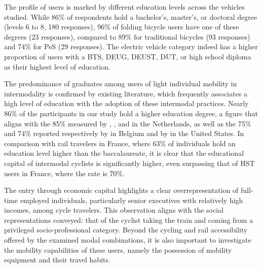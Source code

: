 \begin{refsegment}
The profile of users is marked by different education levels across the vehicles studied. While 86\% of respondents hold a bachelor's, master's, or doctoral degree (levels $6$ to $8$, 180 responses), 96\% of folding bicycle users have one of these degrees (23 responses), compared to 89\% for traditional bicycles (93 responses) and 74\% for \acrshort{PeS} (29 responses). The electric vehicle category indeed has a higher proportion of users with a \acrshort{BTS}, \acrshort{DEUG}, \acrshort{DEUST}, \acrshort{DUT}, or high school diploma as their highest level of education.%


The predominance of graduates among users of light individual mobility in intermodality is confirmed by existing literature, which frequently associates a high level of education with the adoption of these intermodal practices. Nearly 86\% of the participants in our study hold a higher education degree, a figure that aligns with the 85\% measured by \textcolor{blue}{\textcite[15]{shelat_analysing_2018}}, \textcolor{blue}{\textcite[113]{heinen_multimodal_2014}}, and \textcolor{blue}{\textcite[11]{jonkeren_bicycle-train_2021}} in the Netherlands, as well as the 75\% and 74\% reported respectively by \textcolor{blue}{\textcite[6, 8]{adnan_last-mile_2019}} in Belgium and by \textcolor{blue}{\textcite[103]{flamm_public_2014}} in the United States. In comparison with rail travelers in France, where 63\% of individuals hold an education level higher than the baccalaureate, it is clear that the educational capital of intermodal cyclists is significantly higher, even surpassing that of \acrshort{HST} users in France, where the rate is 70\%.%

The entry through economic capital highlights a clear overrepresentation of full-time employed individuals, particularly senior executives with relatively high incomes, among cycle travelers. This observation aligns with the social representations conveyed: that of the cyclist taking the train and coming from a privileged socio-professional category. Beyond the cycling and rail accessibility offered by the examined modal combinations, it is also important to investigate the mobility capabilities of these users, namely the possession of mobility equipment and their travel habits.%


\end{refsegment}
